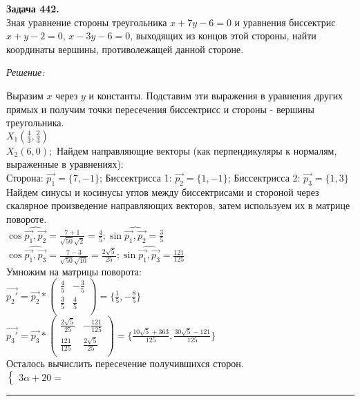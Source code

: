 \documentclass[a4paper, 12pt]{article}
\newenvironment{problem}[2][Задача]
    { \begin{mdframed}[backgroundcolor=gray!10] \textbf{#1 #2.} \\}
    {  \end{mdframed}}
\newenvironment{solution}
    {\textit{Решение: }}
    {\noindent\rule{7in}{1.5pt}}
\begin{document}
\begin{problem}{442}
Зная уравнение стороны треугольника $x+7y-6=0$ и уравнения биссектрис $x+y-2=0$, $x-3y-6=0$,
выходящих из концов этой стороны, найти координаты вершины, противолежащей данной стороне.
\end{problem}
\begin{solution}

Выразим $x$ через $y$ и константы. Подставим эти выражения в уравнения других прямых и получим точки пересечения биссектрисс и стороны - вершины треугольника. \\
$X_1(\frac{4}{3}, \frac{2}{3})$ \\
$X_2(6, 0);$
Найдем направляющие векторы (как перпендикуляры к нормалям, выраженные в уравнениях): \\
Сторона: $\vec{p_1}=\{7, -1\}$;
Биссектрисса 1: $\vec{p_2}=\{1, -1\}$;
Биссектрисса 2: $\vec{p_3}=\{1, 3\}$
\\
Найдем синусы и косинусы углов между биссектрисами и стороной через скалярное произведение направляющих векторов, затем используем их в матрице повороте. \\
$\cos{\widehat{\vec{p_1}, \vec{p_2}}} = \frac{7+1}{\sqrt{50}\sqrt2} = \frac{4}{5};
\sin{\widehat{\vec{p_1}, \vec{p_2}}} = \frac{3}{5}$ \\
$\cos{\widehat{\vec{p_1}, \vec{p_3}}} = \frac{7-3}{\sqrt{50}\sqrt{10}} = \frac{2\sqrt5}{25};
\sin{\widehat{\vec{p_1}, \vec{p_3}}} = \frac{121}{125}$ \\
Умножим на матрицы поворота: \\
$
\overrightarrow{p_2'} =
\vec{p_2} *
\left(
  \begin{array}{rr}
    \frac{4}{5} & -\frac{3}{5} \\
    \frac{3}{5} & \frac{4}{5} \\
  \end{array}
\right)
=
\{\frac{1}{5}, -\frac{8}{5}\}
$ \\
$
\overrightarrow{p_3'} =
\vec{p_3} *
\left(
  \begin{array}{rr}
    \frac{2\sqrt5}{25} & -\frac{121}{125} \\
    \frac{121}{125} & \frac{2\sqrt5}{25} \\
  \end{array}
\right)
= \{\frac{10\sqrt5 + 363}{125}, \frac{30\sqrt5 - 121}{125}\}
$ \\
Осталось вычислить пересечение получившихся сторон. \\
$
\left\{
  \begin{array}{rr}
    3\alpha + 20 = 
  \end{array}
\right.
$

\end{solution}
\end{document}
